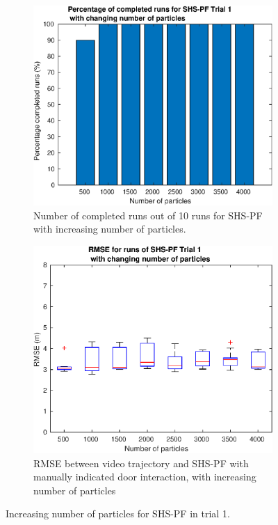 \begin{figure}[H]
	\centering
	\begin{subfigure}[t]{.4\textwidth}
		\centering
		\includegraphics[width=\linewidth]{images/20201129_1147_Trial_1_nr_particles_1}
		\caption{Number of completed runs out of 10 runs for SHS-PF with increasing number of particles.}
		\label{fig:trial1_nr_particles_complete}
	\end{subfigure} \quad
	\begin{subfigure}[t]{.4\textwidth}
		\centering
		\includegraphics[width=\linewidth]{images/20201129_1154_Trial_1_RMSE_nr_particles_1}
		\caption{RMSE between video trajectory and SHS-PF with manually indicated door interaction, with increasing number of particles}
		\label{fig:trial1_nr_particles_RMSE}
	\end{subfigure}
\setlength{\belowcaptionskip}{-20pt}
\caption{Increasing number of particles for SHS-PF in trial 1.}
\label{fig:trial1_nr_particles}
\end{figure}

